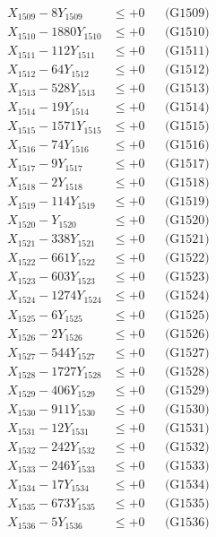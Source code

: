 \documentclass[a4paper,10pt]{article}
\begin{document}
{\begin{align}
X_{1509} - 8Y_{1509} &\leq +0 && \text{(G1509)} \\
X_{1510} - 1880Y_{1510} &\leq +0 && \text{(G1510)} \\
\allowbreak
X_{1511} - 112Y_{1511} &\leq +0 && \text{(G1511)} \\
X_{1512} - 64Y_{1512} &\leq +0 && \text{(G1512)} \\
X_{1513} - 528Y_{1513} &\leq +0 && \text{(G1513)} \\
X_{1514} - 19Y_{1514} &\leq +0 && \text{(G1514)} \\
X_{1515} - 1571Y_{1515} &\leq +0 && \text{(G1515)} \\
X_{1516} - 74Y_{1516} &\leq +0 && \text{(G1516)} \\
X_{1517} - 9Y_{1517} &\leq +0 && \text{(G1517)} \\
X_{1518} - 2Y_{1518} &\leq +0 && \text{(G1518)} \\
X_{1519} - 114Y_{1519} &\leq +0 && \text{(G1519)} \\
X_{1520} - Y_{1520} &\leq +0 && \text{(G1520)} \\
\allowbreak
X_{1521} - 338Y_{1521} &\leq +0 && \text{(G1521)} \\
X_{1522} - 661Y_{1522} &\leq +0 && \text{(G1522)} \\
X_{1523} - 603Y_{1523} &\leq +0 && \text{(G1523)} \\
X_{1524} - 1274Y_{1524} &\leq +0 && \text{(G1524)} \\
X_{1525} - 6Y_{1525} &\leq +0 && \text{(G1525)} \\
X_{1526} - 2Y_{1526} &\leq +0 && \text{(G1526)} \\
X_{1527} - 544Y_{1527} &\leq +0 && \text{(G1527)} \\
X_{1528} - 1727Y_{1528} &\leq +0 && \text{(G1528)} \\
X_{1529} - 406Y_{1529} &\leq +0 && \text{(G1529)} \\
X_{1530} - 911Y_{1530} &\leq +0 && \text{(G1530)} \\
\allowbreak
X_{1531} - 12Y_{1531} &\leq +0 && \text{(G1531)} \\
X_{1532} - 242Y_{1532} &\leq +0 && \text{(G1532)} \\
X_{1533} - 246Y_{1533} &\leq +0 && \text{(G1533)} \\
X_{1534} - 17Y_{1534} &\leq +0 && \text{(G1534)} \\
X_{1535} - 673Y_{1535} &\leq +0 && \text{(G1535)} \\
X_{1536} - 5Y_{1536} &\leq +0 && \text{(G1536)} \\

\end{align}}
\end{document}
